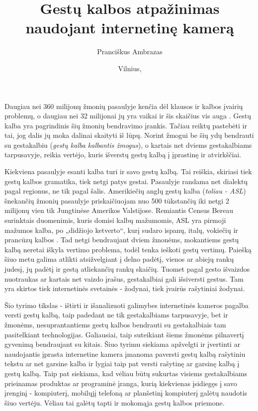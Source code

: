 \documentclass{VUMIFInfKursinis}
\title{Gestų kalbos atpažinimas naudojant internetinę kamerą}
\author{Pranciškus Ambrazas}
\date{Vilnius, \the\year}
\begin{document}
\maketitle

\tableofcontents


Daugiau nei 360 milijonų žmonių pasaulyje kenčia dėl klausos ir kalbos įvairių problemų, o daugiau nei 32 milijonai jų yra vaikai ir šis skaičius vis auga \cite{WhoInt}. Gestų kalba yra pagrindinis šių žmonių bendravimo įrankis. Tačiau reiktų pastebėti ir tai, jog dalis jų moka dalinai skaityti iš lūpų. Norint žmogui be šių ydų bendrauti su gestakalbiu (\textit{gestų kalba kalbantis žmogus}), o kartais net dviems gestakalbiams tarpusavyje, reikia vertėjo, kuris išverstų gestų kalbą į įprastinę ir atvirkščiai.

Kiekviena pasaulyje esanti kalba turi ir savo gestų kalbą. Tai reiškia, skiriasi tiek gestų kalbos gramatika, tiek netgi patys gestai. Pasaulyje randama net dialektų pagal regionus, ne tik pagal šalis. Amerikiečių anglų gestų kalba (\textit{toliau - ASL}) šnekančių žmonių pasaulyje priskaičiuojam nuo 500 tūkstančių iki netgi 2 milijonų vien tik Jungtinėse Amerikos Valstijose. Remiantis Census Bereau surinktais duomenimis, kuris domisi kalbų mažumomis, ASL yra pirmoji mažumos kalba, po „didžiojo ketverto“, kurį sudaro ispanų, italų, vokiečių ir prancūzų kalbos \cite{GUL}. Tad netgi bendraujant dviem žmonėms, mokantiems gestų kalbą neretai iškyla vertimo problema, todėl tenka ieškoti gestų vertimų. Paiešką šiuo metu galima atlikti atsižvelgiant į delno padėtį, vienos ar abiejų rankų judesį, jų padėtį ir gestą atliekančių rankų skaičių. Tuomet pagal gesto išvaizdos nuotraukas ar kartais net vaizdo įrašus, gestakalbiai gali išsiversti gestus. Tam yra skirtos tiek internetinės svetainės - žodynai, tiek įvairūs rašytiniai žodynai.



Šio tyrimo tikslas - ištirti ir išanalizuoti galimybes internetinės kameros pagalba versti gestų kalbą, taip padedant ne tik gestakalbiams tarpusavyje, bet ir žmonėms, nesuprantantiems gestų kalbos bendrauti su gestakalbiais tam pasitelkiant technologijas. Galiausiai, taip suteikiant šiems žmonėms pilnavertį gyvenimą bendraujant su kitais. Šiuo tyrimu siekiama apžvelgti ir įvertinti ar naudojantis įprasta internetine kamera įmanoma paversti gestų kalbą rašytiniu tekstu ar net garsine kalba ir lygiai taip pat versti rašytinę ar garsinę kalbą į gestų kalbą. Taip pat siekiama, kad vėliau būtų sukurtas visiems gestakalbiams prieinamas produktas ar programinė įranga, kurią kiekvienas įsidiegęs į savo įrenginį - kompiuterį, mobilųjį telefoną ar planšetinį kompiuterį galėtų naudotis šiuo vertėju. Vėliau tai galėtų tapti ir mokomąja gestų kalbos priemone. 
\end{document}
